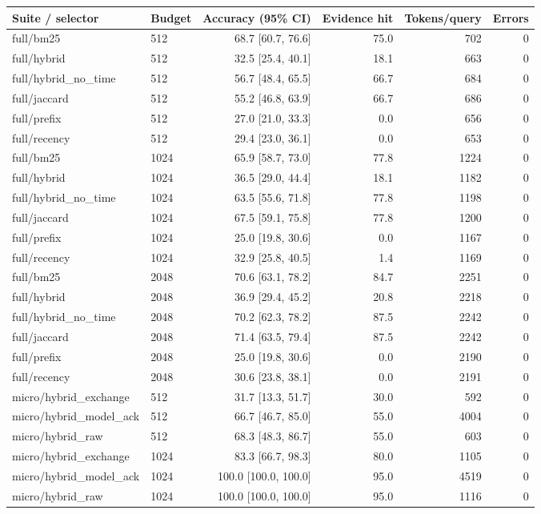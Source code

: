 \begin{tabular}{llrrrr}
\toprule
Suite / selector & Budget & Accuracy (95\% CI) & Evidence hit & Tokens/query & Errors \\
\midrule
full/bm25 & 512 & 68.7 [60.7, 76.6] & 75.0 & 702 & 0 \\
full/hybrid & 512 & 32.5 [25.4, 40.1] & 18.1 & 663 & 0 \\
full/hybrid\_no\_time & 512 & 56.7 [48.4, 65.5] & 66.7 & 684 & 0 \\
full/jaccard & 512 & 55.2 [46.8, 63.9] & 66.7 & 686 & 0 \\
full/prefix & 512 & 27.0 [21.0, 33.3] & 0.0 & 656 & 0 \\
full/recency & 512 & 29.4 [23.0, 36.1] & 0.0 & 653 & 0 \\
full/bm25 & 1024 & 65.9 [58.7, 73.0] & 77.8 & 1224 & 0 \\
full/hybrid & 1024 & 36.5 [29.0, 44.4] & 18.1 & 1182 & 0 \\
full/hybrid\_no\_time & 1024 & 63.5 [55.6, 71.8] & 77.8 & 1198 & 0 \\
full/jaccard & 1024 & 67.5 [59.1, 75.8] & 77.8 & 1200 & 0 \\
full/prefix & 1024 & 25.0 [19.8, 30.6] & 0.0 & 1167 & 0 \\
full/recency & 1024 & 32.9 [25.8, 40.5] & 1.4 & 1169 & 0 \\
full/bm25 & 2048 & 70.6 [63.1, 78.2] & 84.7 & 2251 & 0 \\
full/hybrid & 2048 & 36.9 [29.4, 45.2] & 20.8 & 2218 & 0 \\
full/hybrid\_no\_time & 2048 & 70.2 [62.3, 78.2] & 87.5 & 2242 & 0 \\
full/jaccard & 2048 & 71.4 [63.5, 79.4] & 87.5 & 2242 & 0 \\
full/prefix & 2048 & 25.0 [19.8, 30.6] & 0.0 & 2190 & 0 \\
full/recency & 2048 & 30.6 [23.8, 38.1] & 0.0 & 2191 & 0 \\
micro/hybrid\_exchange & 512 & 31.7 [13.3, 51.7] & 30.0 & 592 & 0 \\
micro/hybrid\_model\_ack & 512 & 66.7 [46.7, 85.0] & 55.0 & 4004 & 0 \\
micro/hybrid\_raw & 512 & 68.3 [48.3, 86.7] & 55.0 & 603 & 0 \\
micro/hybrid\_exchange & 1024 & 83.3 [66.7, 98.3] & 80.0 & 1105 & 0 \\
micro/hybrid\_model\_ack & 1024 & 100.0 [100.0, 100.0] & 95.0 & 4519 & 0 \\
micro/hybrid\_raw & 1024 & 100.0 [100.0, 100.0] & 95.0 & 1116 & 0 \\

\end{tabular}
